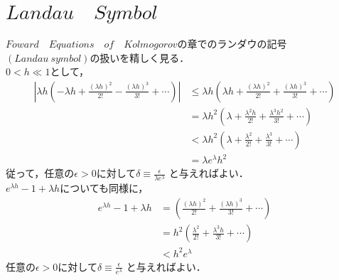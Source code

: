 \documentclass[a4j,papersize,disablejfam,slide,14pt]{jsarticle}
\def\exp#1{e^{#1}} %
\begin{document}
\section{$Landau\quad Symbol$}
\label{sec:appendix_landau}
	$Foward\quad Equations\quad of\quad Kolmogorov$の章でのランダウの記号$(Landau\ symbol)$の扱いを精しく見る．\\
	$0 < h \ll 1$として，
    \begin{align}
    	\left| \lambda h \left(- \lambda h + \frac{(\lambda h)^2}{2!} - \frac{(\lambda h)^3}{3!} + \cdots \right) \right|
        &\leq \lambda h \left(\lambda h + \frac{(\lambda h)^2}{2!} + \frac{(\lambda h)^3}{3!} + \cdots \right) \\
        &= \lambda h^2 \left(\lambda + \frac{\lambda^2 h}{2!} + \frac{\lambda^3 h^2}{3!} + \cdots \right) \\
        &< \lambda h^2 \left(\lambda + \frac{\lambda^2}{2!} + \frac{\lambda^3}{3!} + \cdots \right) \\
        &= \lambda \exp{\lambda} h^2
    \end{align}
    従って，任意の$\epsilon > 0$に対して$\delta \equiv \frac{\epsilon}{\lambda \exp{\lambda}}$ と与えればよい．\\
    $\exp{\lambda h} - 1 + \lambda h$についても同様に，
    \begin{align}
    	\exp{\lambda h} - 1 + \lambda h &= \left(\frac{(\lambda h)^2}{2!} + \frac{(\lambda h)^3}{3!} + \cdots \right) \\
        &= h^2 \left(\frac{\lambda^2}{2!} + \frac{\lambda^3 h}{3!} + \cdots \right) \\
        &< h^2 \exp{\lambda}
    \end{align}
    任意の$\epsilon > 0$に対して$\delta \equiv \frac{\epsilon}{\exp{\lambda}}$ と与えればよい．
\end{document}
